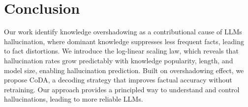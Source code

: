 \section{Conclusion}
Our work identify knowledge overshadowing as a contributional cause of LLMs hallucination, where dominant knowledge suppresses less frequent facts, leading to fact distortions. We introduce the log-linear scaling law, which reveals that hallucination rates grow predictably with knowledge popularity, length, and model size, enabling hallucination prediction. Built on overshadowing effect, we propose CoDA, a decoding strategy that improves factual accuracy without retraining. Our approach provides a principled way to understand and control hallucinations, leading to more reliable LLMs.
